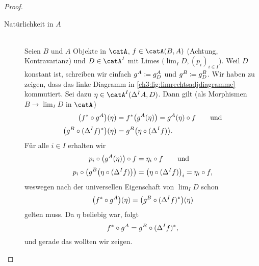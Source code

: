\begin{proof}
    \begin{description}
        \item[Natürlichkeit in \boldmath$A$]\hfill\\
            Seien $B$ und $A$ Objekte in $\catA$, $f\in\catA(B,A)$ (Achtung,
            Kontravarianz) und $D\in\catA^I$ mit Limes $\bigl(\lim_I
            D,(p_i)_{i\in I}\bigr)$. Weil $D$ konstant ist, schreiben wir
            einfach $g^A \coloneqq g_D^A$ und $g^B \coloneqq g_D^B$.
            Wir haben zu zeigen, dass das linke Diagramm in
            \cref{ch3:fig:limrechtsadjdiagramme} kommutiert.  Sei dazu
            $\eta\in\catA^I(\Delta^I A, D)$. Dann gilt (als Morphismen
            $B\to\lim_I D$ in $\catA$)
            \begin{align*}
                \bigl(f^* \after g^A\bigr)(\eta)
                &= f^*\bigl( g^A(\eta) \bigr)
                 = g^A(\eta) \after f
                \qquad\text{und}\\[0.5ex]
                \bigl(g^B \after (\Delta^I f)^*\bigr)(\eta)
                &= g^B\bigl( \eta \after (\Delta^I f) \bigr)
            . \end{align*}
            Für alle $i\in I$ erhalten wir
            \begin{align*}
                p_i\after \bigl(g^A(\eta)\bigr)\after f 
                &= \eta_i\after f
                \qquad\text{und}\\[0.5ex]
                p_i\after \bigl(g^B\bigl( \eta \after (\Delta^I f) \bigr)\bigr)
                &= \bigl( \eta \after (\Delta^I f)\bigr)_i
                 = \eta_i \after f
            , \end{align*}
            weswegen nach der universellen Eigenschaft von $\lim_I D$
            schon 
            \[ \bigl(f^* \after g^A\bigr)(\eta) 
                = \bigl(g^B \after (\Delta^I f)^*\bigr)(\eta)
            \]
            gelten muss. Da $\eta$ beliebig war, folgt
            \[ f^* \after g^A = g^B \after (\Delta^I f)^* , \]
            und gerade das wollten wir zeigen.
            

\end{description}
\end{proof}
